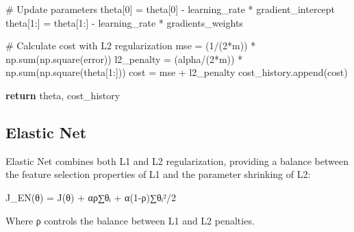 \documentclass[
  letterpaper,
  DIV=11,
  numbers=noendperiod]{scrreprt}
\newenvironment{Shaded}{\begin{snugshade}}{\end{snugshade}}
\newcommand{\BuiltInTok}[1]{\textcolor[rgb]{0.00,0.23,0.31}{#1}}
\newcommand{\CommentTok}[1]{\textcolor[rgb]{0.37,0.37,0.37}{#1}}
\newcommand{\ControlFlowTok}[1]{\textcolor[rgb]{0.00,0.23,0.31}{\textbf{#1}}}
\newcommand{\DecValTok}[1]{\textcolor[rgb]{0.68,0.00,0.00}{#1}}
\newcommand{\NormalTok}[1]{\textcolor[rgb]{0.00,0.23,0.31}{#1}}
\newcommand{\OperatorTok}[1]{\textcolor[rgb]{0.37,0.37,0.37}{#1}}
\begin{document}
\begin{Shaded}
\begin{Highlighting}[]
        \CommentTok{\# Update parameters}
\NormalTok{        theta[}\DecValTok{0}\NormalTok{] }\OperatorTok{=}\NormalTok{ theta[}\DecValTok{0}\NormalTok{] }\OperatorTok{{-}}\NormalTok{ learning\_rate }\OperatorTok{*}\NormalTok{ gradient\_intercept}
\NormalTok{        theta[}\DecValTok{1}\NormalTok{:] }\OperatorTok{=}\NormalTok{ theta[}\DecValTok{1}\NormalTok{:] }\OperatorTok{{-}}\NormalTok{ learning\_rate }\OperatorTok{*}\NormalTok{ gradients\_weights}
        
        \CommentTok{\# Calculate cost with L2 regularization}
\NormalTok{        mse }\OperatorTok{=}\NormalTok{ (}\DecValTok{1}\OperatorTok{/}\NormalTok{(}\DecValTok{2}\OperatorTok{*}\NormalTok{m)) }\OperatorTok{*}\NormalTok{ np.}\BuiltInTok{sum}\NormalTok{(np.square(error))}
\NormalTok{        l2\_penalty }\OperatorTok{=}\NormalTok{ (alpha}\OperatorTok{/}\NormalTok{(}\DecValTok{2}\OperatorTok{*}\NormalTok{m)) }\OperatorTok{*}\NormalTok{ np.}\BuiltInTok{sum}\NormalTok{(np.square(theta[}\DecValTok{1}\NormalTok{:]))}
\NormalTok{        cost }\OperatorTok{=}\NormalTok{ mse }\OperatorTok{+}\NormalTok{ l2\_penalty}
\NormalTok{        cost\_history.append(cost)}
        
    \ControlFlowTok{return}\NormalTok{ theta, cost\_history}
\end{Highlighting}
\end{Shaded}

\subsection{Elastic Net}\label{elastic-net}

Elastic Net combines both L1 and L2 regularization, providing a balance
between the feature selection properties of L1 and the parameter
shrinking of L2:

J\_EN(θ) = J(θ) + αρ∑\textbar θᵢ\textbar{} + α(1-ρ)∑θᵢ²/2

Where ρ controls the balance between L1 and L2 penalties.
\end{document}
